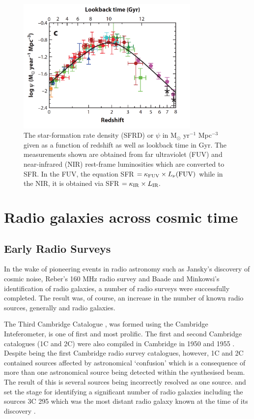 \documentclass[10pt,a4paper]{article}
\begin{document}
\begin{figure}[!ht]
   \centering
   \includegraphics[width=0.8\textwidth]{plots_chp1/SFRD_z_Madau_Dickinson_2014.png}
   \caption[SFRD as a function of redshift in \citet{MadauDickinson2014}]{The star-formation rate density (SFRD) or $\psi$ in M$_\odot$ yr$^{-1}$ Mpc$^{-3}$ given as a function of redshift as well as lookback time in Gyr. The measurements shown are obtained from far ultraviolet (FUV) and near-infrared (NIR) rest-frame luminosities which are converted to SFR. In the FUV, the equation SFR $= \kappa_{\rm{FUV}} \times L_\nu (\rm{FUV})$ while in the NIR, it is obtained via SFR $= \kappa_{\rm{IR}} \times L_{\rm{IR}}.$}
   \label{fig:SFRD_z_Madau_Dickinson2014}
\end{figure}

\section{Radio galaxies across cosmic time} 
\subsection{Early Radio Surveys}
In the wake of pioneering events in radio astronomy such as Jansky's discovery of cosmic noise, Reber's 160 MHz radio survey and Baade and Minkowsi's identification of radio galaxies, a number of radio surveys were successfully completed. The result was, of course, an increase in the number of known radio sources, generally and radio galaxies. 

The Third Cambridge Catalogue \citep[3C][]{Edge1959}, was formed using the Cambridge Inteferometer, is one of first and most prolific. The first and second Cambridge catalogues (1C and 2C) were also compiled in Cambridge in 1950 \citep{Ryle1950} and 1955 \citep{Shakeshaft1955}. Despite being the first Cambridge radio survey catalogues, however, 1C and 2C contained sources affected by astronomical `confusion' which is a consequence of more than one astronomical source being detected within the synthesised beam. The result of this is several sources being incorrectly resolved as one source. and set the stage for identifying a significant number of radio galaxies including the sources 3C 295 which was the most distant radio galaxy known at the time of its discovery \citep{Minkowski1960}. 
\end{document}

